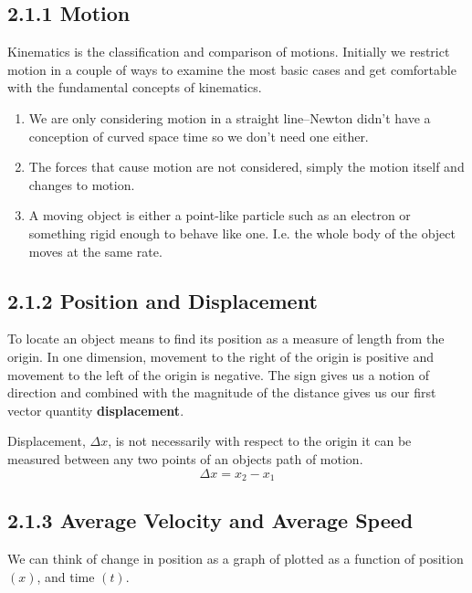 \documentclass{article}
\begin{document}
\subsection*{2.1.1 Motion}
Kinematics is the classification and comparison of motions. Initially we restrict motion in a couple of ways to examine the most basic cases and get comfortable with the fundamental concepts of kinematics.
\begin{enumerate}
	\item We are only considering motion in a straight line--Newton didn't have a conception of curved space time so we don't need one either.
	\item The forces that cause motion are not considered, simply the motion itself and changes to motion.
	\item A moving object is either a point-like particle such as an electron or something rigid enough to behave like one. I.e. the whole body of the object moves at the same rate.
\end{enumerate}

\subsection*{2.1.2 Position and Displacement}
To locate an object means to find its position as a measure of length from the origin. In one dimension, movement to the right of the origin is positive and movement to the left of the origin is negative. The sign gives us a notion of direction and combined with the magnitude of the distance gives us our first vector quantity \textbf{displacement}.

Displacement, $\Delta x$, is not necessarily with respect to the origin it can be measured between any two points of an objects path of motion.
\[
	\Delta x = x_2-x_1
\]

\subsection*{2.1.3 Average Velocity and Average Speed}
We can think of change in position as a graph of plotted as a function of position $(x)$, and time $(t)$.
\end{document}
